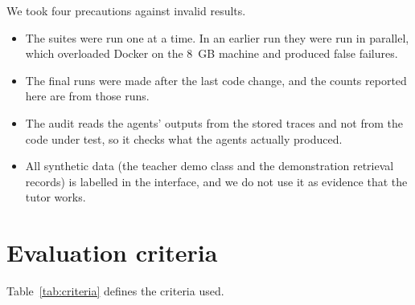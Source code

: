 We took four precautions against invalid results.
\begin{itemize}
\item The suites were run one at a time. In an earlier run they were run in parallel, which overloaded Docker on the 8~GB machine and produced false failures.
\item The final runs were made after the last code change, and the counts reported here are from those runs.
\item The audit reads the agents' outputs from the stored traces and not from the code under test, so it checks what the agents actually produced.
\item All synthetic data (the teacher demo class and the demonstration retrieval records) is labelled in the interface, and we do not use it as evidence that the tutor works.
\end{itemize}

\section{Evaluation criteria}
Table~\ref{tab:criteria} defines the criteria used.

